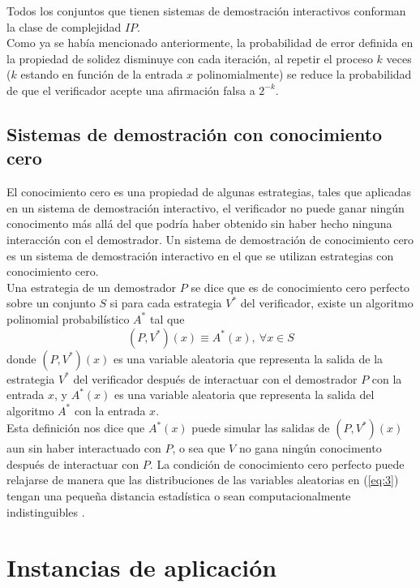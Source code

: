 \documentclass[oneside,10pt]{article}
\begin{document}
Todos los conjuntos que tienen sistemas de demostración interactivos conforman la clase de complejidad $IP$. \\

Como ya se había mencionado anteriormente, la probabilidad de error definida en la propiedad de solidez disminuye con cada iteración, al repetir el proceso $k$ veces  ($k$ estando en función de la entrada $x$ polinomialmente) se reduce la probabilidad de que el verificador acepte una afirmación falsa a $2^{-k}$.

\subsection{Sistemas de demostración con conocimiento cero}

El conocimiento cero es una propiedad de algunas estrategias, tales que aplicadas en un sistema de demostración interactivo, el verificador no puede ganar ningún conocimento más allá del que podría haber obtenido sin haber hecho ninguna interacción con el demostrador. Un sistema de demostración de conocimiento cero es un sistema de demostración interactivo en el que se utilizan estrategias con conocimiento cero. \\

Una estrategia de un demostrador $P$ se dice que es de conocimiento cero perfecto sobre un conjunto $S$ si para cada estrategia $V^*$ del verificador, existe un algoritmo polinomial probabilístico $A^*$ tal que
\begin{equation} \label{eq:3}
  (P,V^*)(x) \equiv A^*(x),\ \forall x \in S
\end{equation}
donde $(P,V^*)(x)$ es una variable aleatoria que representa la salida de la estrategia $V^*$ del verificador después de interactuar con el demostrador $P$ con la entrada $x$, y $A^*(x)$ es una variable aleatoria que representa la salida del algoritmo $A^*$ con la entrada $x$. \cite{oded} \\

Esta definición nos dice que $A^*(x)$ puede simular las salidas de $(P,V^*)(x)$ aun sin haber interactuado con $P$, o sea que $V$ no gana ningún conocimento después de interactuar con $P$. La condición de conocimiento cero perfecto puede relajarse de manera que las distribuciones de las variables aleatorias en (\ref{eq:3}) tengan una pequeña distancia estadística o sean computacionalmente indistinguibles \cite{arora}.

\section{Instancias de aplicación}
\end{document}
